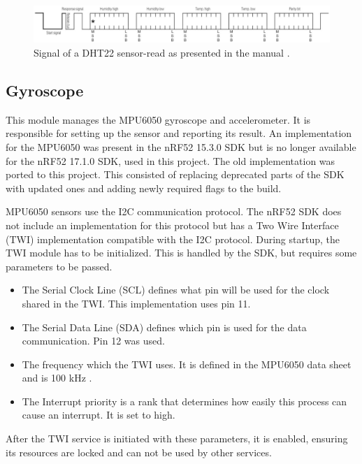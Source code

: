 \begin{figure}[ht!]
\centering
\includegraphics[width=\linewidth]{graphics/DHT22_signal.png}
\caption{Signal of a DHT22 sensor-read as presented in the manual \cite{AM2302}.}
\label{f:dht22_signal}
\end{figure}

\subsection{Gyroscope}
\label{ss:gyro_module}
This module manages the MPU6050 gyroscope and accelerometer.
It is responsible for setting up the sensor and reporting its result.
An implementation for the MPU6050 was present in the nRF52 15.3.0 SDK but is no longer available for the nRF52 17.1.0 SDK, used in this project.
The old implementation was ported to this project.
This consisted of replacing deprecated parts of the SDK with updated ones and adding newly required flags to the build.


MPU6050 sensors use the I2C communication protocol.
The nRF52 SDK does not include an implementation for this protocol but has a Two Wire Interface (TWI) implementation compatible with the I2C protocol.
During startup, the TWI module has to be initialized.
This is handled by the SDK, but requires some parameters to be passed.
\begin{itemize}
	\item The Serial Clock Line (SCL) defines what pin will be used for the clock shared in the TWI. This implementation uses pin 11.
	\item The Serial Data Line (SDA) defines which pin is used for the data communication. Pin 12 was used.
	\item The frequency which the TWI uses. It is defined in the MPU6050 data sheet and is 100 kHz \cite{MPU6050}.
	\item The Interrupt priority is a rank that determines how easily this process can cause an interrupt. It is set to high.
\end{itemize}
After the TWI service is initiated with these parameters, it is enabled, ensuring its resources are locked and can not be used by other services.


